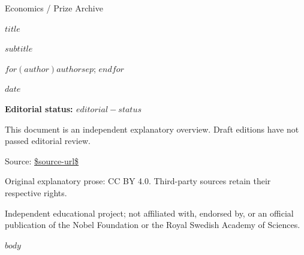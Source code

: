 \documentclass[11pt]{article}
\begin{document}
\begin{titlepage}
{\small Economics / Prize Archive}\par\vspace{2cm}
{\huge $title$\par}\vspace{.7cm}
{\large $subtitle$\par}\vspace{.7cm}
$for(author)$$author$$sep$; $endfor$\par
$date$\par\vspace{1cm}
\textbf{Editorial status: $editorial-status$}\par
This document is an independent explanatory overview. Draft editions have not passed editorial review.\par\vfill
Source: \url{$source-url$}\par
Original explanatory prose: CC BY 4.0. Third-party sources retain their respective rights.\par
\small Independent educational project; not affiliated with, endorsed by, or an official publication of the Nobel Foundation or the Royal Swedish Academy of Sciences.
\end{titlepage}
\tableofcontents\newpage
$body$
\end{document}
